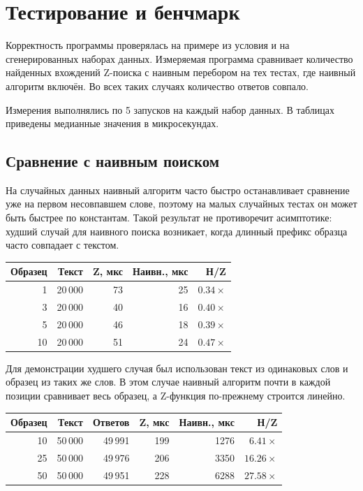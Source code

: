 \section{Тестирование и бенчмарк}

Корректность программы проверялась на примере из условия и на сгенерированных наборах данных.
Измеряемая программа сравнивает количество найденных вхождений Z-поиска с наивным перебором на тех
тестах, где наивный алгоритм включён. Во всех таких случаях количество ответов совпало.

Измерения выполнялись по 5 запусков на каждый набор данных. В таблицах приведены медианные значения
в микросекундах.

\subsection{Сравнение с наивным поиском}

На случайных данных наивный алгоритм часто быстро останавливает сравнение уже на первом несовпавшем
слове, поэтому на малых случайных тестах он может быть быстрее по константам. Такой результат не
противоречит асимптотике: худший случай для наивного поиска возникает, когда длинный префикс образца
часто совпадает с текстом.

\begin{center}
\begin{tabular}{|r|r|r|r|r|}
\hline
\rowcolor{lightgray}
Образец & Текст & Z, мкс & Наивн., мкс & Н/Z \\
\hline
1 & 20\,000 & 73 & 25 & \(0.34\times\) \\
\hline
3 & 20\,000 & 40 & 16 & \(0.40\times\) \\
\hline
5 & 20\,000 & 46 & 18 & \(0.39\times\) \\
\hline
10 & 20\,000 & 51 & 24 & \(0.47\times\) \\
\hline
\end{tabular}
\end{center}

Для демонстрации худшего случая был использован текст из одинаковых слов и образец из таких же слов.
В этом случае наивный алгоритм почти в каждой позиции сравнивает весь образец, а Z-функция по-прежнему
строится линейно.

\begin{center}
\begin{tabular}{|r|r|r|r|r|r|}
\hline
\rowcolor{lightgray}
Образец & Текст & Ответов & Z, мкс & Наивн., мкс & Н/Z \\
\hline
10 & 50\,000 & 49\,991 & 199 & 1276 & \(6.41\times\) \\
\hline
25 & 50\,000 & 49\,976 & 206 & 3350 & \(16.26\times\) \\
\hline
50 & 50\,000 & 49\,951 & 228 & 6288 & \(27.58\times\) \\
\hline
\end{tabular}
\end{center}

